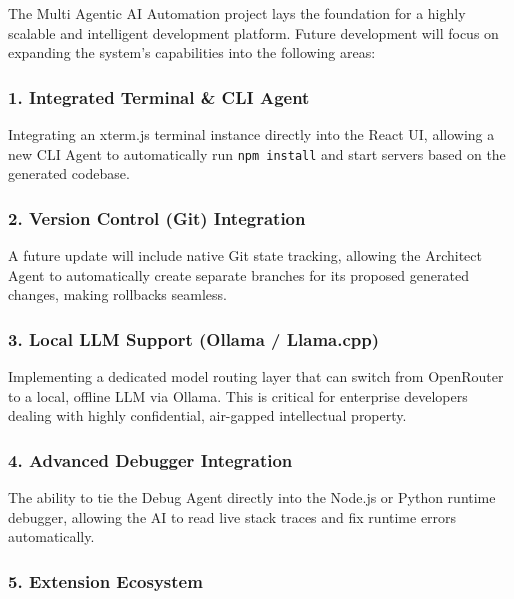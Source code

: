 \documentclass[
  12pt,
]{article}
\begin{document}
The Multi Agentic AI Automation project lays the foundation for a highly
scalable and intelligent development platform. Future development will
focus on expanding the system's capabilities into the following areas:

\subsubsection{1. Integrated Terminal \& CLI
Agent}\label{integrated-terminal-cli-agent}

Integrating an xterm.js terminal instance directly into the React UI,
allowing a new CLI Agent to automatically run \texttt{npm\ install} and
start servers based on the generated codebase.

\subsubsection{2. Version Control (Git)
Integration}\label{version-control-git-integration}

A future update will include native Git state tracking, allowing the
Architect Agent to automatically create separate branches for its
proposed generated changes, making rollbacks seamless.

\subsubsection{3. Local LLM Support (Ollama /
Llama.cpp)}\label{local-llm-support-ollama-llama.cpp}

Implementing a dedicated model routing layer that can switch from
OpenRouter to a local, offline LLM via Ollama. This is critical for
enterprise developers dealing with highly confidential, air-gapped
intellectual property.

\subsubsection{4. Advanced Debugger
Integration}\label{advanced-debugger-integration}

The ability to tie the Debug Agent directly into the Node.js or Python
runtime debugger, allowing the AI to read live stack traces and fix
runtime errors automatically.

\subsubsection{5. Extension Ecosystem}\label{extension-ecosystem}
\end{document}
